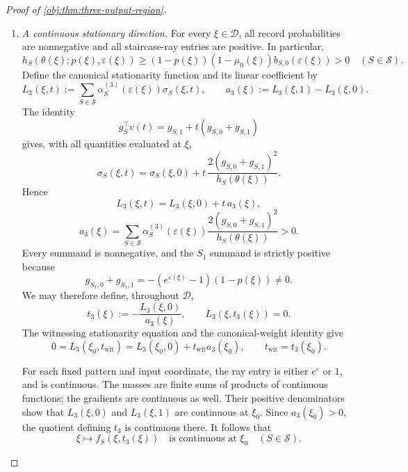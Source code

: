 \begin{proof}[Proof of \cref{obj:thm:three-output-region}]
\begin{enumerate}
\item \textit{A continuous stationary direction.}
For every \(\xi\in\mathcal D\), all record probabilities are nonnegative and all staircase-ray entries are positive. In particular,
\[
h_S(\theta(\xi);p(\xi),\varepsilon(\xi))
\ge
(1-p(\xi))(1-\mu_0(\xi))b_{S,0}(\varepsilon(\xi))
>0
\quad(S\in\mathcal S).
\]
Define the canonical stationarity function and its linear coefficient by
\[
L_3(\xi,t):=
\sum_{S\in\mathcal S}
\alpha^{(3)}_S(\varepsilon(\xi))\sigma_S(\xi,t),
\qquad
a_3(\xi):=L_3(\xi,1)-L_3(\xi,0).
\]
The identity
\[
g_S^\top v(t)=g_{S,1}+t(g_{S,0}+g_{S,1})
\]
gives, with all quantities evaluated at \(\xi\),
\[
\sigma_S(\xi,t)
=
\sigma_S(\xi,0)
+
t\,\frac{2(g_{S,0}+g_{S,1})^2}{h_S(\theta(\xi))}.
\]
Hence
\[
L_3(\xi,t)=L_3(\xi,0)+t\,a_3(\xi),
\]
\[
a_3(\xi)=
\sum_{S\in\mathcal S}
\alpha^{(3)}_S(\varepsilon(\xi))
\frac{2(g_{S,0}+g_{S,1})^2}{h_S(\theta(\xi))}>0.
\]
Every summand is nonnegative, and the \(S_1\) summand is strictly positive because
\[
g_{S_1,0}+g_{S_1,1}
=-(e^{\varepsilon(\xi)}-1)(1-p(\xi))\ne0.
\]
We may therefore define, throughout \(\mathcal D\),
\[
t_3(\xi):=-\frac{L_3(\xi,0)}{a_3(\xi)},
\qquad
L_3(\xi,t_3(\xi))=0.
\]
The witnessing stationarity equation and the canonical-weight identity give
\[
0=L_3(\xi_0,t_{\mathrm{wit}})
=L_3(\xi_0,0)+t_{\mathrm{wit}}a_3(\xi_0),
\qquad
t_{\mathrm{wit}}=t_3(\xi_0).
\]

For each fixed pattern and input coordinate, the ray entry is either \(e^\varepsilon\) or \(1\), and is continuous. The masses are finite sums of products of continuous functions; the gradients are continuous as well. Their positive denominators show that \(L_3(\xi,0)\) and \(L_3(\xi,1)\) are continuous at \(\xi_0\). Since \(a_3(\xi_0)>0\), the quotient defining \(t_3\) is continuous there. It follows that
\[
\xi\longmapsto f_S(\xi,t_3(\xi))
\quad\text{is continuous at }\xi_0
\quad(S\in\mathcal S).
\]


\end{enumerate}
\end{proof}
